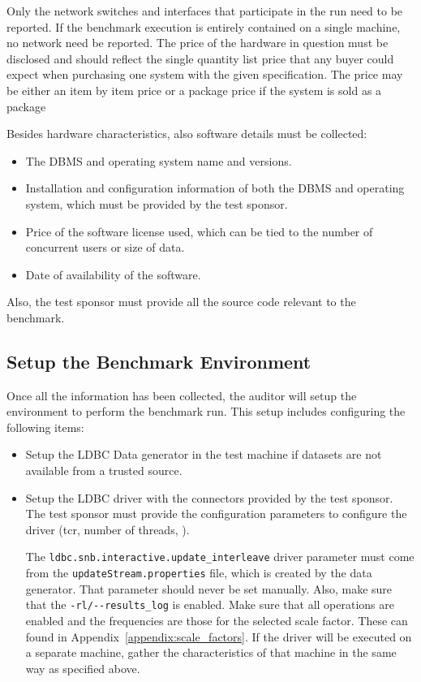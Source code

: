 Only the network switches and interfaces that participate in the run need to be
reported. If the benchmark execution is entirely contained on a single machine,
no network need be reported.  The price of the hardware in question must be
disclosed and should reflect the single quantity list price that any buyer
could expect when purchasing one system with the given specification. The price
may be either an item by item price or a package price if the system is sold as
a package

Besides hardware characteristics, also software details must be collected:

\begin{itemize}
\item The DBMS and operating system name and versions.
\item Installation and configuration information of both the DBMS and operating
system, which must be provided by the test sponsor.
\item Price of the software license used, which can be tied to the number of
concurrent users or size of data.
\item Date of availability of the software.
\end{itemize}

Also, the test sponsor must provide all the source code relevant to the
benchmark.

\subsection{Setup the Benchmark Environment}

Once all the information has been collected, the auditor will setup the
environment to perform the benchmark run. This setup includes configuring the
following items:


\begin{itemize}
\item Setup the LDBC Data generator in the test machine if datasets are not
available from a trusted source.
\item Setup the LDBC driver with the connectors provided by the test sponsor.
The test sponsor must provide the configuration parameters to configure the
driver (tcr, number of threads, \etc).

The \verb|ldbc.snb.interactive.update_interleave|
driver parameter must come from the \verb|updateStream.properties|
file, which is created by the data generator. That parameter should never be set manually.
Also, make sure that the \verb|-rl/--results_log| is enabled.  Make sure that
all operations are enabled and the frequencies are those for the selected scale
factor. These can found in Appendix~\ref{appendix:scale_factors}.  If the driver
will be executed on a separate machine, gather the characteristics of that
machine in the same way as specified above.
\end{itemize}


